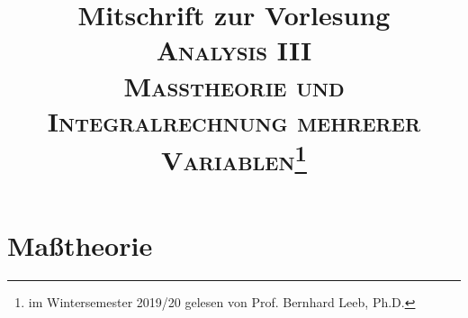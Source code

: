 
\title{\LARGE Mitschrift zur
 Vorlesung \\ \huge \scshape Analysis III   \\ \vspace{0.2pc} \normalfont \Large Maßtheorie und Integralrechnung mehrerer Variablen\footnote{im Wintersemester 2019/20 gelesen von Prof. Bernhard Leeb, Ph.D.}}

\maketitle
\tableofcontents 
{}
\newpage
\section{Maßtheorie}
